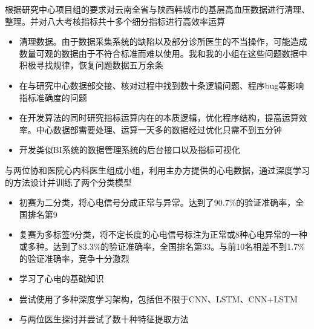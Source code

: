 \documentclass[9pt,a4paper]{altacv}
\begin{document}
%
%
%
%
%
%
\begin{fullwidth}
	
	
	\begin{multicols}{2}
		
		根据研究中心项目组的要求对云南全省与陕西韩城市的基层高血压数据进行清理、整理。并对八大考核指标共十多个细分指标进行高效率运算
		\begin{itemize}
			\item 清理数据。由于数据采集系统的缺陷以及部分诊所医生的不当操作，可能造成数量可观的数据由于不符合标准而难以使用。我和我的小组在这些问题数据中积极寻找规律，恢复问题数据五万余条
			\item 在与研究中心数据部交接、核对过程中找到数十条逻辑问题、程序bug等影响指标准确度的问题
			\item 在开发算法的同时研究指标运算内在的本质逻辑，优化程序结构，提高运算效率。中心数据部需要处理、运算一天多的数据经过优化只需不到五分钟
			\item 开发类似BI系统的数据管理系统的后台接口以及指标可视化
		\end{itemize}
		
		\divider
		
		与两位协和医院心内科医生组成小组，利用主办方提供的心电数据，通过深度学习的方法设计并训练了两个分类模型
		\begin{itemize}
			\item 初赛为二分类，将心电信号分成正常与异常。达到了90.7\%的验证准确率，全国排名第9
			\item 复赛为多标签9分类，将不定长度的心电信号标注为正常或8种心电异常的一种或多种。达到了83.3\%的验证准确率，全国排名第33。与前10名相差不到1.7\%的验证准确率，竞争十分激烈
			\item 学习了心电的基础知识
			\item 尝试使用了多种深度学习架构，包括但不限于CNN、LSTM、CNN+LSTM
			\item 与两位医生探讨并尝试了数十种特征提取方法
		\end{itemize}
		

\end{multicols}
\end{fullwidth}
\end{document}
